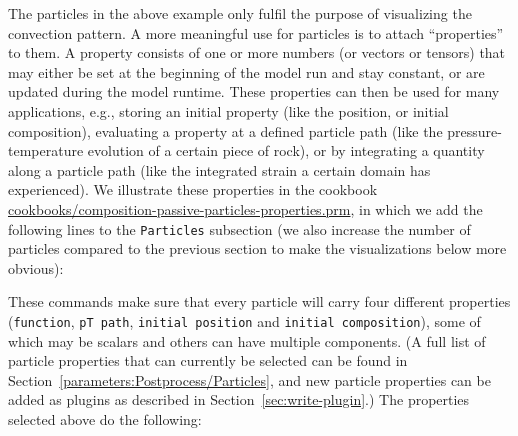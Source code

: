 \documentclass{article}
\begin{document}
The particles in the above example only fulfil the purpose of
visualizing the convection pattern. A more meaningful use for
particles is to attach ``properties'' to them. A property consists of
one or more numbers (or vectors or tensors) that may either be set at
the beginning of the model run and stay constant, or are updated
during the model runtime. These properties can then be used for many
applications, e.g., storing an initial property (like the position, or
initial composition), evaluating a property at a defined particle path (like the
pressure-temperature evolution of a certain piece of rock), or by integrating a
quantity along a particle path (like the integrated strain a certain domain has
experienced).  We illustrate these properties in the cookbook
\url{cookbooks/composition-passive-particles-properties.prm}, in which we add the
following lines to the \texttt{Particles} subsection (we also increase the number
of particles compared to the previous section to make the visualizations below
more obvious):



These commands make sure that every particle will carry four different
properties (\texttt{function}, \texttt{pT path}, \texttt{initial
  position} and \texttt{initial composition}), some of which may be
scalars and others can have multiple components. (A full list of
particle properties that can currently be selected can be found in
Section~\ref{parameters:Postprocess/Particles}, and new particle
properties can be added as plugins as described in
Section~\ref{sec:write-plugin}.) The properties selected above do the following:
\end{document}
